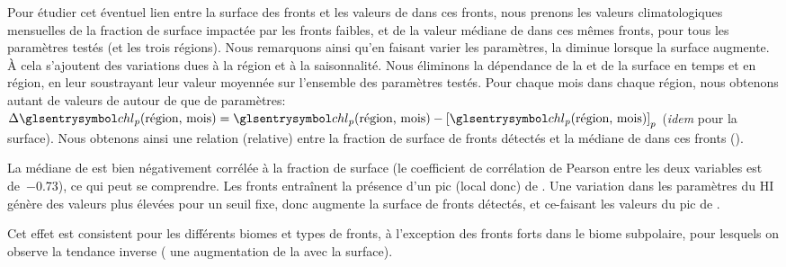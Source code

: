 Pour étudier cet éventuel lien entre la surface des fronts et les valeurs de  dans ces fronts, nous prenons les valeurs climatologiques mensuelles de la fraction de surface impactée par les fronts faibles, et de la valeur médiane de  dans ces mêmes fronts, pour tous les paramètres testés (et les trois régions). Nous remarquons ainsi qu'en faisant varier les paramètres, la  diminue lorsque la surface augmente.
À cela s'ajoutent des variations dues à la région et à la saisonnalité.
Nous éliminons la dépendance de la  et de la surface en temps et en région, en leur soustrayant leur valeur moyennée sur l'ensemble des paramètres testés.
Pour chaque mois dans chaque région, nous obtenons autant de valeurs de  autour de  que de paramètres: \(\Delta\am{chl}_p(\text{région, mois}) = \am{chl}_p(\text{région, mois}) - \moy{\am{chl}_p(\text{région, mois})}_p\) (\emph{idem} pour la surface).
Nous obtenons ainsi une relation (relative) entre la fraction de surface de fronts détectés et la médiane de  dans ces fronts ().

\begin{figure}
  \centering
  \label{fig:sensibilite-surface}
\end{figure}

La médiane de  est bien négativement corrélée à la fraction de surface (le coefficient de corrélation de Pearson entre les deux variables est de~\num{-0.73}), ce qui peut se comprendre.
Les fronts entraînent la présence d'un pic (local donc) de .
Une variation dans les paramètres du HI génère des valeurs plus élevées pour un seuil fixe, donc augmente la surface de fronts détectés, et ce-faisant  les valeurs du pic de .

Cet effet est consistent pour les différents biomes et types de fronts, à l'exception des fronts forts dans le biome subpolaire, pour lesquels on observe la tendance inverse ( une augmentation de la  avec la surface).

